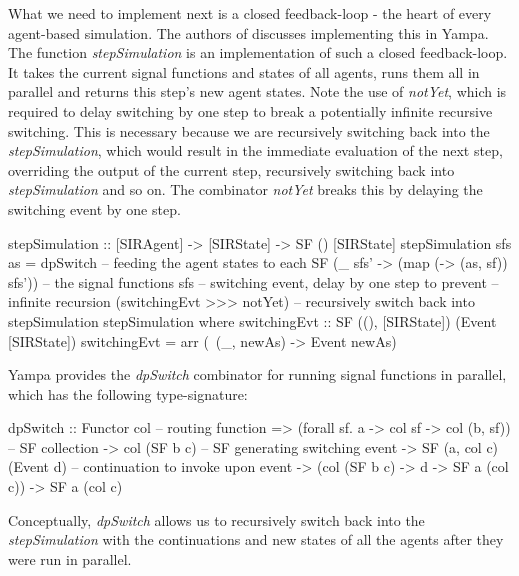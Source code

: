 What we need to implement next is a closed feedback-loop - the heart of every agent-based simulation. The authors of \cite{courtney_yampa_2003, nilsson_functional_2002} discusses implementing this in Yampa. The function \textit{stepSimulation} is an implementation of such a closed feedback-loop. It takes the current signal functions and states of all agents, runs them all in parallel and returns this step's new agent states. Note the use of \textit{notYet}, which is required to delay switching by one step to break a potentially infinite recursive switching. This is necessary because we are recursively switching back into the \textit{stepSimulation}, which would result in the immediate evaluation of the next step, overriding the output of the current step, recursively switching back into \textit{stepSimulation} and so on. The combinator \textit{notYet} breaks this by delaying the switching event by one step.

\begin{HaskellCode}
stepSimulation :: [SIRAgent] -> [SIRState] -> SF () [SIRState]
stepSimulation sfs as =
    dpSwitch
      -- feeding the agent states to each SF
      (\_ sfs' -> (map (\sf -> (as, sf)) sfs'))
      -- the signal functions
      sfs
      -- switching event, delay by one step to prevent
      -- infinite recursion
      (switchingEvt >>> notYet)
      -- recursively switch back into stepSimulation         
      stepSimulation                            
  where
    switchingEvt :: SF ((), [SIRState]) (Event [SIRState])
    switchingEvt = arr (\ (_, newAs) -> Event newAs)
\end{HaskellCode}

Yampa provides the \textit{dpSwitch} combinator for running signal functions in parallel, which has the following type-signature:

\begin{HaskellCode}
dpSwitch :: Functor col
         -- routing function
         => (forall sf. a -> col sf -> col (b, sf))
         -- SF collection
         -> col (SF b c)
         -- SF generating switching event     
         -> SF (a, col c) (Event d)
         -- continuation to invoke upon event           
         -> (col (SF b c) -> d -> SF a (col c))
         -> SF a (col c)
\end{HaskellCode}

Conceptually, \textit{dpSwitch} allows us to recursively switch back into the \textit{stepSimulation} with the continuations and new states of all the agents after they were run in parallel. 

